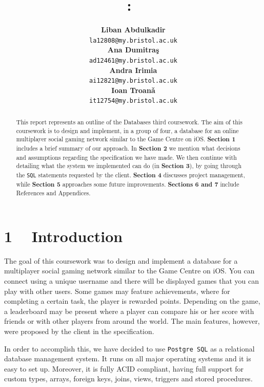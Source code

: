 \documentclass{article}
\title{
\vspace{0.2in}
\textmd{\textbf{\hmwkClass:\ \hmwkTitle}}\\
\vspace{0.5in}
\textmd{\hmwkDueDate}
\vspace{1.5in}
}
\author{
  \textbf{Liban Abdulkadir}\\
  \texttt{la12808@my.bristol.ac.uk}\\
  \textbf{Ana Dumitra\c{s}}\\
  \texttt{ad12461@my.bristol.ac.uk}\\
  \textbf{Andra Irimia}\\
  \texttt{ai12821@my.bristol.ac.uk}\\
  \textbf{Ioan Troan\v{a}}\\
  \texttt{it12754@my.bristol.ac.uk}\\
\vspace{1in}
}
\date{}
\begin{document}
\maketitle





\begin{abstract}
This report represents an outline of the Databases third coursework. The aim of this coursework is to design and implement, in a group of four, a database for an online multiplayer social gaming network similar to the Game Centre on iOS. \textbf{Section 1} includes a brief summary of our approach. In \textbf{Section 2} we mention what decisions and assumptions regarding the specification we have made. We then continue with detailing what the system we implemented can do (in \textbf{Section 3}), by going through the \texttt{SQL} statements requested by the client. \textbf{Section 4} discusses project management, while  \textbf{Section 5} approaches some future improvements.\textbf{ Sections 6 and 7} include References and Appendices.

\end{abstract}


\section{1  ~ Introduction}
\par {The goal of this coursework was to design and implement a database for a multiplayer social gaming network similar to the Game Centre on iOS. You can connect using a unique username and there will be displayed games that you can play with other users. Some games may feature achievements, where for completing a certain task, the player is rewarded points. Depending on the game, a leaderboard may be present where a player can compare his or her score with friends or with other players from around the world. The main features, however, were proposed by the client in the specification.} \\
\par {In order to accomplish this, we have decided to use \texttt {Postgre SQL} as a relational database management system. It runs on all major operating systems and it is easy to set up. Moreover, it is fully ACID compliant, having full support for custom types, arrays, foreign keys, joins, views, triggers and stored procedures. \cite{link1}}
\end{document}
